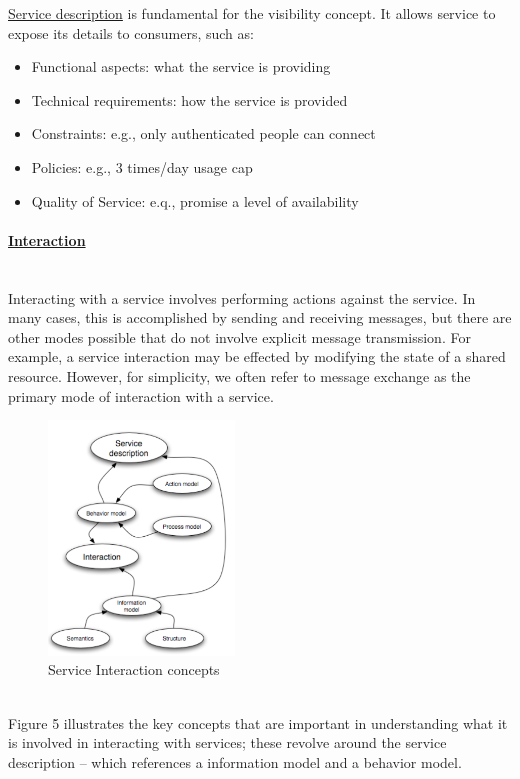 \documentclass[10pt,a4paper]{article}
\newcommand{\myparagraph}[1]{\paragraph{\uline{#1}}\mbox{}\\[0.05in]}
\begin{document}
\uline{Service description} is fundamental for the visibility concept. It allows service to expose its details to consumers, such as: \begin{itemize}
	\item Functional aspects: what the service is providing
	\item Technical requirements: how the service is provided
	\item Constraints: e.g., only authenticated people can connect
	\item Policies: e.g., 3 times/day usage cap
	\item Quality of Service: e.q., promise a level of availability
\end{itemize}
 \myparagraph{Interaction}
Interacting with a service involves performing actions against the service. In many cases, this is accomplished by sending and receiving messages, but there are other modes possible that do not involve explicit message transmission. For example, a service interaction may be effected by modifying the state of a shared resource. However, for simplicity, we often refer to message exchange as the primary mode of interaction with a service.
\begin{figure}[h!]
 \hfill \includegraphics[width=140pt]{images/interaction}\hspace*{\fill}
  \caption{Service Interaction concepts}
  \label{fig:interaction}
\end{figure}  \\
Figure 5 illustrates the key concepts that are important in understanding what it is involved in interacting with services; these revolve around the service description – which references a information model and a behavior model.
\end{document}
